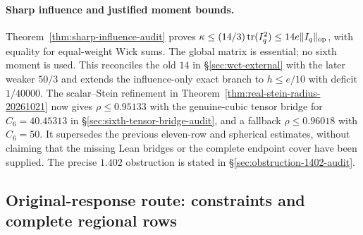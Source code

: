\paragraph{Sharp influence and justified moment bounds.}
Theorem~\ref{thm:sharp-influence-audit} proves
$\kappa\le(14/3)\operatorname{tr}(I_q^2)\le14e\|I_q\|_{\rm op}$,
with equality for equal-weight Wick sums. The global matrix is essential;
no sixth moment is used. This reconciles the old $14$ in
\S\ref{sec:wct-external} with the later weaker $50/3$ and extends the
influence-only exact branch to $h\le e/10$ with deficit $1/40000$.
The scalar--Stein refinement in Theorem~\ref{thm:real-stein-radius-20261021}
now gives $\rho\le0.95133$ with the genuine-cubic tensor bridge for
$C_6=40.45313$ in \S\ref{sec:sixth-tensor-bridge-audit}, and a fallback
$\rho\le0.96018$ with $C_6=50$. It supersedes the previous eleven-row
and spherical estimates, without claiming that the missing Lean
bridges or the complete endpoint cover have been supplied.
The precise $1.402$ obstruction is stated in
\S\ref{sec:obstruction-1402-audit}.

\subsection{Original-response route: constraints and complete regional rows}
